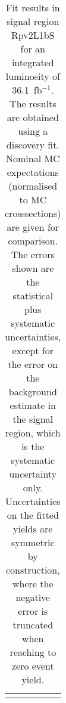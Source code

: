 \begin{table}
\begin{center}
{\begin{tabular*}{\textwidth}{@{\extracolsep{\fill}}lr}
\noalign{\smallskip}\hline\noalign{\smallskip}
\end{tabular*}
}
\end{center}
\caption{Fit results in signal region Rpv2L1bS for an integrated luminosity of 36.1~fb$^{-1}$.
The results are obtained using a discovery fit. Nominal MC expectations (normalised to MC crosssections) are given for comparison.
The errors shown are the statistical plus systematic uncertainties, except for the error on the background estimate in the signal region, which is the systematic uncertainty only.
Uncertainties on the fitted yields are symmetric by construction, where the negative error is truncated when reaching to zero event yield.
}
\label{table.results.systematics.in.logL.fit..Yields.Rpv2L1bS}
\end{table}
\clearpage
%